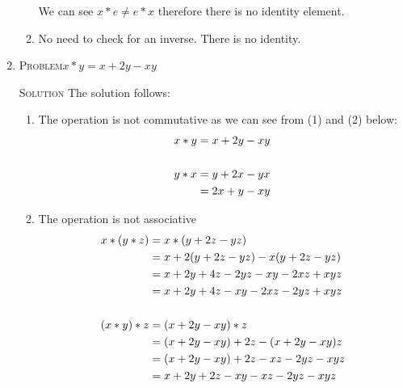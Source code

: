 \documentclass{amsart}
\newcommand{\Solution}{\textsc{Solution}\xspace}
\newcommand{\Problem}{\textsc{Problem}\xspace}
\begin{document}
\begin{enumerate}
\begin{enumerate}
      We can see $x*e \ne e*x$ therefore there is no identity element.

      \item No need to check for an inverse. There is no identity.
   \end{enumerate}

   \item \Problem $x * y = x + 2y - xy$

   \noindent \Solution The solution follows:

   \begin{enumerate}
      
      \item The operation is not commutative as we can see from
            (1) and (2) below:
      \begin{align*}
         x * y & = x + 2y - xy \\
	                       \\
	 y * x & = y + 2x - yx \\
	       & = 2x + y - xy \notag
      \end{align*}


      \item The operation is not associative
      \begin{align*}
         x * (y * z) & = x * (y + 2z - yz)                          \\
	             & = x + 2(y + 2z - yz) - x(y + 2z - yz) \notag \\
		     & = x + 2y + 4z - 2yz - xy - 2xz + xyz  \notag \\
		     & = x + 2y + 4z - xy - 2xz - 2yz + xyz  \notag \\
		     \notag \\
	 (x * y) * z & = (x + 2y - xy) * z                          \\
	             & = (x + 2y - xy) + 2z - (x + 2y - xy)z \notag \\
		     & = (x + 2y - xy) + 2z - xz - 2yz - xyz \notag \\
		     & = x + 2y + 2z - xy - xz - 2yz - xyz   \notag
      \end{align*}


\end{enumerate}
\end{enumerate}
\end{document}
